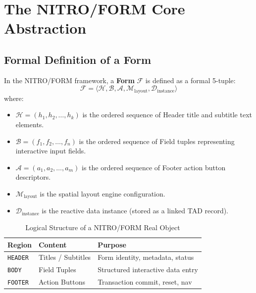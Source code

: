 \documentclass[10pt,journal,compsoc,twocolumn]{article}
\begin{document}
\section{The NITRO/FORM Core Abstraction}
\label{sec:core_abstraction}

\subsection{Formal Definition of a Form}
In the NITRO/FORM framework, a \textbf{Form} $\mathcal{F}$ is defined as a formal 5-tuple:
\begin{equation}
\mathcal{F} = \langle \mathcal{H}, \mathcal{B}, \mathcal{A}, \mathcal{M}_{\text{layout}}, \mathcal{D}_{\text{instance}} \rangle
\end{equation}
where:
\begin{itemize}[leftmargin=*]
    \item $\mathcal{H} = (h_1, h_2, \dots, h_k)$ is the ordered sequence of Header title and subtitle text elements.
    \item $\mathcal{B} = (f_1, f_2, \dots, f_n)$ is the ordered sequence of Field tuples representing interactive input fields.
    \item $\mathcal{A} = (a_1, a_2, \dots, a_m)$ is the ordered sequence of Footer action button descriptors.
    \item $\mathcal{M}_{\text{layout}}$ is the spatial layout engine configuration.
    \item $\mathcal{D}_{\text{instance}}$ is the reactive data instance (stored as a linked TAD record).
\end{itemize}

\begin{table}[htbp]
\caption{Logical Structure of a NITRO/FORM Real Object}
\label{tab:form_regions}
\centering
\footnotesize
\begin{tabular}{@{}lll@{}}
\toprule
\textbf{Region} & \textbf{Content} & \textbf{Purpose} \\
\midrule
\texttt{HEADER} & Titles / Subtitles & Form identity, metadata, status \\
\texttt{BODY}   & Field Tuples       & Structured interactive data entry \\
\texttt{FOOTER} & Action Buttons     & Transaction commit, reset, nav \\
\bottomrule
\end{tabular}
\end{table}
\end{document}
